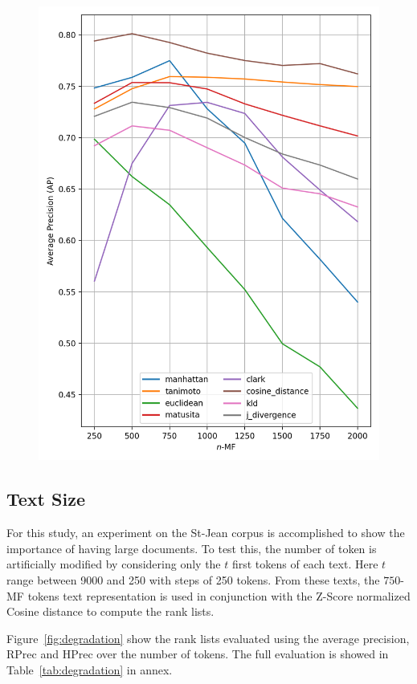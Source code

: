 \begin{figure}
  \label{fig:lemmas}
  \includegraphics[width=0.9\linewidth]{img/mf_lemmas.png}
\end{figure}

\subsection{Text Size\label{sec:importance_of_text_size}}

For this study, an experiment on the St-Jean corpus is accomplished to show the importance of having large documents.
To test this, the number of token is artificially modified by considering only the $t$ first tokens of each text.
Here $t$ range between 9000 and 250 with steps of 250 tokens.
From these texts, the $750$-MF tokens text representation is used in conjunction with the Z-Score normalized Cosine distance to compute the rank lists.

Figure~\ref{fig:degradation} show the rank lists evaluated using the average precision, RPrec and HPrec over the number of tokens.
The full evaluation is showed in Table~\ref{tab:degradation} in annex.

